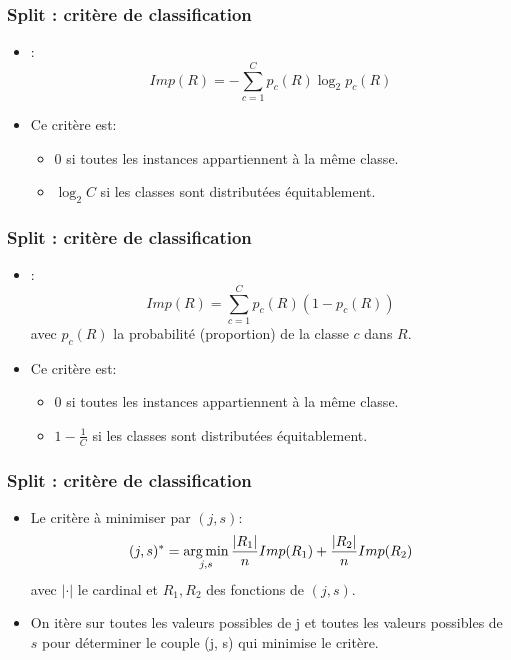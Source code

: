 \begin{frame}
  \frametitle{Split : critère de classification}
  \begin{itemize}
    \item {} :  
    \begin{equation*}
      Imp(R) = -\sum_{c=1}^{C}p_c(R)\log_2p_c(R)
    \end{equation*}
    \item Ce critère est:
    \begin{itemize}
      \item 0 si toutes les instances appartiennent à la même classe.
      \item $\log_2{C}$ si les classes sont distributées équitablement.
    \end{itemize}
  \end{itemize}
\end{frame}


\begin{frame}
  \frametitle{Split : critère de classification}
  \begin{itemize}
    \item {}: 
    \begin{equation*}
    Imp(R) = \sum_{c=1}^{C}p_c(R)(1-p_c(R))
    \end{equation*}
    avec $p_c(R)$ la probabilité (proportion) de la classe $c$ dans $R$.     
    \item Ce critère est:
    \begin{itemize}
      \item 0 si toutes les instances appartiennent à la même classe.
      \item $1-\frac{1}{C}$ si les classes sont distributées équitablement.
    \end{itemize}
  \end{itemize}
\end{frame}

\begin{frame}
  \frametitle{Split : critère de classification}
  \begin{itemize}
    \item Le critère à minimiser par $(j,s)$:
    \begin{equation*}
    (j,s)^{\ast} = \operatorname*{arg\,min}_{j,s}\frac{|R_1|}{n}Imp(R_1) + \frac{|R_2|}{n}Imp(R_2)
    \end{equation*}
    avec $|\cdot|$ le cardinal et $R_1, R_2$ des fonctions de $(j,s)$. 
    \item On itère sur toutes les valeurs possibles de j et toutes les valeurs possibles de $s$ pour déterminer le couple (j, s) qui minimise le critère.
  \end{itemize}
\end{frame}

